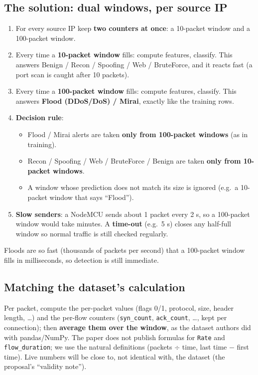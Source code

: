 \documentclass[11pt]{article}
\begin{document}
\subsection*{The solution: dual windows, per source IP}
\begin{enumerate}
\item For every source IP keep \textbf{two counters at once}: a 10-packet window and a 100-packet window.
\item Every time a \textbf{10-packet window} fills: compute features, classify. This answers Benign / Recon / Spoofing / Web / BruteForce, and it reacts fast
(a port scan is caught after 10 packets).
\item Every time a \textbf{100-packet window} fills: compute features, classify. This answers \textbf{Flood (DDoS/DoS) / Mirai}, exactly like the training rows.
\item \textbf{Decision rule}:
\begin{itemize}
\item Flood / Mirai alerts are taken \textbf{only from 100-packet windows} (as in training).
\item Recon / Spoofing / Web / BruteForce / Benign are taken \textbf{only from 10-packet windows}.
\item A window whose prediction does not match its size is ignored (e.g.\ a 10-packet window that says ``Flood'').
\end{itemize}
\item \textbf{Slow senders}: a NodeMCU sends about 1 packet every 2 s, so a 100-packet window would take minutes. A \textbf{time-out} (e.g.\ 5 s)
closes any half-full window so normal traffic is still checked regularly.
\end{enumerate}
Floods are so fast (thousands of packets per second) that a 100-packet window fills in milliseconds, so detection is still immediate.

\subsection*{Matching the dataset's calculation}
Per packet, compute the per-packet values (flags 0/1, protocol, size, header length, \dots) and the per-flow counters (\texttt{syn\_count},
\texttt{ack\_count}, \dots, kept per connection); then \textbf{average them over the window}, as the dataset authors did with pandas/NumPy.
The paper does not publish formulas for \texttt{Rate} and \texttt{flow\_duration}; we use the natural definitions
(packets $\div$ time, last time $-$ first time). Live numbers will be close to, not identical with, the dataset (the proposal's ``validity note'').
\end{document}
